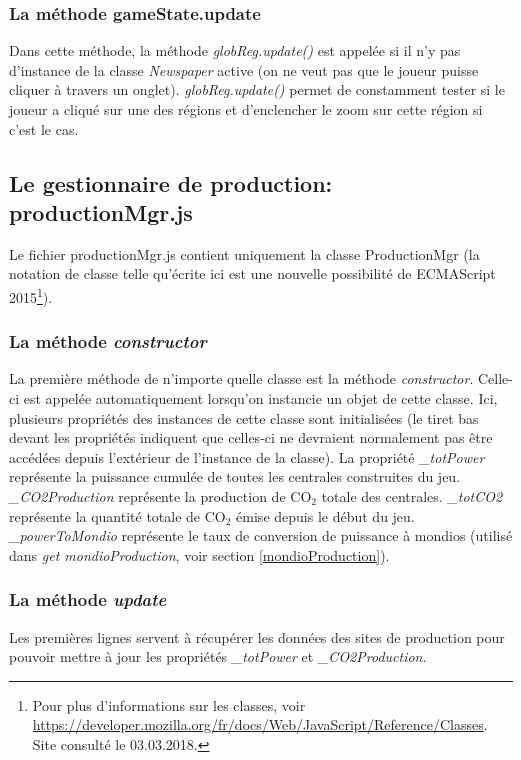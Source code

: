 \documentclass{article}
\begin{document}
		\subsubsection{La méthode gameState.update}
		Dans cette méthode, la méthode \textit{globReg.update()} est appelée si il n'y pas d'instance de la classe \textit{Newspaper} active (on ne veut pas que le joueur puisse cliquer à travers un onglet). \textit{globReg.update()} permet de constamment tester si le joueur a cliqué sur une des régions et d'enclencher le zoom sur cette région si c'est le cas.
		
		
		\subsection{Le gestionnaire de production: productionMgr.js} \label{productionMgr}
		
		Le fichier productionMgr.js contient uniquement la classe ProductionMgr (la notation de classe telle qu'écrite ici est une nouvelle possibilité de ECMAScript 2015\footnote{Pour plus d'informations sur les classes, voir \url{https://developer.mozilla.org/fr/docs/Web/JavaScript/Reference/Classes}. Site consulté le 03.03.2018.}).
		
		\subsubsection{La méthode \textit{constructor}}
		La première méthode de n'importe quelle classe est la méthode \textit{constructor}. Celle-ci est appelée automatiquement lorsqu'on instancie un objet de cette classe. Ici,  plusieurs propriétés des instances de cette classe sont initialisées (le tiret bas devant les propriétés indiquent que celles-ci ne devraient normalement pas être accédées depuis l'extérieur de l'instance de la classe). La propriété \textit{\_totPower} représente la puissance cumulée de toutes les centrales construites du jeu. \textit{\_CO2Production} représente la production de CO$_{2}$ totale des centrales. \textit{\_totCO2} représente la quantité totale de CO$_{2}$ émise depuis le début du jeu. \textit{\_powerToMondio} représente le taux de conversion de puissance à mondios (utilisé dans \textit{get mondioProduction}, voir section \ref{mondioProduction}).
		
		\subsubsection{La méthode \textit{update}}\label{prodUpdate}
		Les premières lignes servent à récupérer les données des sites de production pour pouvoir mettre à jour les propriétés \textit{\_totPower} et \textit{\_CO2Production}. 
		
\end{document}
